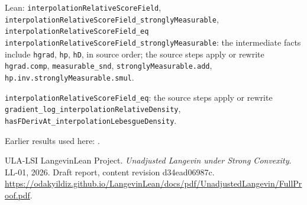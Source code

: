 \documentclass[11pt,a4paper]{article}
\begin{document}
\begin{leanbox}{Lean: \texttt{interpolationRelativeScoreField}, \texttt{interpolationRelativeScoreField\_\allowbreak{}stronglyMeasurable}, \texttt{interpolationRelativeScoreField\_\allowbreak{}eq}}
\texttt{interpolation\allowbreak{}Relative\allowbreak{}Score\allowbreak{}Field\_\allowbreak{}strongly\allowbreak{}Measurable}: the intermediate facts include \texttt{hgrad}, \texttt{hp}, \texttt{h\allowbreak{}D}, in source order; the source steps apply or rewrite \texttt{hgrad.\allowbreak{}comp}, \texttt{measurable\_\allowbreak{}snd}, \texttt{strongly\allowbreak{}Measurable.\allowbreak{}add}, \texttt{hp.\allowbreak{}inv.\allowbreak{}strongly\allowbreak{}Measurable.\allowbreak{}smul}.



\texttt{interpolation\allowbreak{}Relative\allowbreak{}Score\allowbreak{}Field\_\allowbreak{}eq}: the source steps apply or rewrite \texttt{gradient\_\allowbreak{}log\_\allowbreak{}interpolation\allowbreak{}Relative\allowbreak{}Density}, \texttt{has\allowbreak{}FDeriv\allowbreak{}At\_\allowbreak{}interpolation\allowbreak{}Lebesgue\allowbreak{}Density}.
\end{leanbox}


Earlier results used here: \cite[Section~3.26.3]{LangevinLean2026ULASC}.

\begin{thebibliography}{ULA-LSI}
LangevinLean Project. \emph{Unadjusted Langevin under Strong Convexity}. LL-01, 2026. Draft report, content revision d34ead06987c. \url{https://odakyildiz.github.io/LangevinLean/docs/pdf/UnadjustedLangevin/FullProof.pdf}.
\end{thebibliography}
\end{document}
